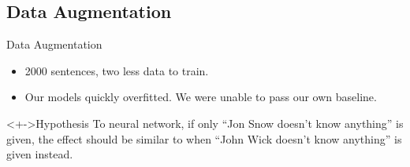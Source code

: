 \documentclass[10pt]{beamer}
\begin{document}
\subsection{Data Augmentation}
\begin{frame}{Data Augmentation}
  \begin{itemize}
  \item<+-> 2000 sentences, two less data to train.
  \item<+-> Our models quickly overfitted. We were unable to pass our own baseline.
  \end{itemize}
  \begin{block}<+->{Hypothesis}
    To neural network, if only ``Jon Snow doesn't know anything'' is given, the effect should be similar to when ``John Wick doesn't know anything'' is given instead.
  \end{block}
  


\end{frame}
\end{document}
